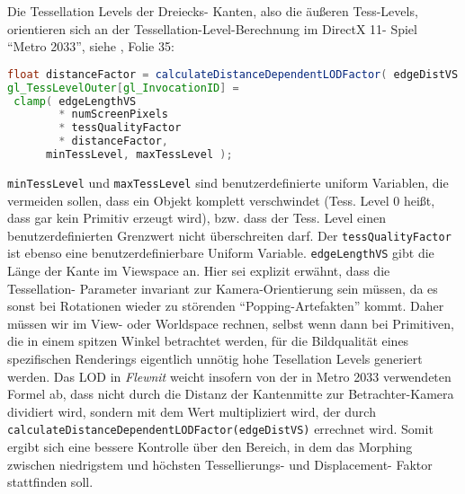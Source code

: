 	Die Tessellation Levels der Dreiecks- Kanten, also die äußeren Tess-Levels, 
	orientieren sich an der Tessellation-Level-Berechnung im 
	DirectX 11- Spiel "`Metro 2033"', siehe \cite{tessMetro2033}, Folie 35:
	\begin{lstlisting}[language=GLSL]
float distanceFactor = calculateDistanceDependentLODFactor( edgeDistVS ) 
gl_TessLevelOuter[gl_InvocationID] =  
 clamp(	edgeLengthVS 
      	* numScreenPixels 
      	* tessQualityFactor 
      	* distanceFactor,
      minTessLevel, maxTessLevel );   
	\end{lstlisting}
	\lstinline|minTessLevel| und \lstinline|maxTessLevel| sind benutzerdefinierte uniform Variablen,
	die vermeiden sollen, dass ein Objekt komplett verschwindet 
	(Tess. Level 0 heißt, dass gar kein Primitiv erzeugt wird), bzw. dass der Tess. Level einen benutzerdefinierten 	
	Grenzwert nicht überschreiten darf.
	Der \lstinline|tessQualityFactor| ist ebenso eine benutzerdefinierbare Uniform Variable. 
	\lstinline|edgeLengthVS| gibt die Länge der Kante im Viewspace an. Hier sei explizit erwähnt, dass die Tessellation-
	Parameter invariant zur Kamera-Orientierung sein müssen, da es sonst bei Rotationen wieder zu störenden
	"`Popping-Artefakten"' kommt. Daher müssen wir im View- oder Worldspace rechnen, selbst wenn dann bei Primitiven,
	die in einem spitzen Winkel betrachtet werden, für die Bildqualität eines spezifischen Renderings eigentlich
	unnötig hohe Tesellation Levels generiert werden.
	Das LOD in \emph{Flewnit} weicht insofern von der in Metro 2033 verwendeten Formel ab, dass nicht durch
	die Distanz der Kantenmitte zur Betrachter-Kamera dividiert wird, sondern mit dem Wert multipliziert wird,
	der durch \lstinline|calculateDistanceDependentLODFactor(edgeDistVS)| errechnet wird.
	Somit ergibt sich eine bessere Kontrolle über den Bereich, in dem das Morphing zwischen niedrigstem
	und höchsten Tessellierungs- und Displacement- Faktor stattfinden soll.\\
	
